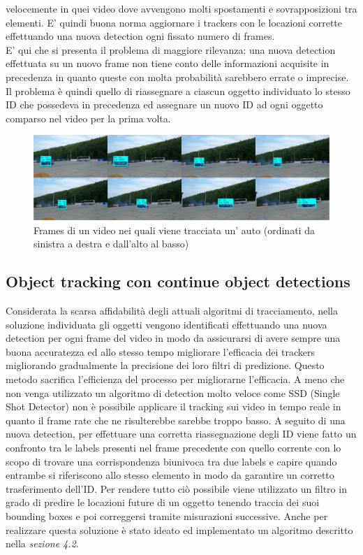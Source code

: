 velocemente in quei video dove avvengono molti spostamenti e sovrapposizioni tra elementi. E' quindi buona norma aggiornare i trackers con le locazioni corrette effettuando una nuova detection ogni fissato numero di frames.\\ E' qui che si presenta il problema di maggiore rilevanza: una nuova detection effettuata su un nuovo frame non tiene conto delle informazioni acquisite in precedenza in quanto queste con molta probabilità sarebbero errate o imprecise. Il problema è quindi quello di riassegnare a ciascun oggetto individuato lo stesso ID che possedeva in precedenza ed assegnare un nuovo ID ad ogni oggetto comparso nel video per la prima volta. 
\begin{figure}[H]
	\centering
	\includegraphics[width=1\linewidth]{images/esempio-tracking.jpg}
	\caption{Frames di un video nei quali viene tracciata un' auto (ordinati da sinistra a destra e dall'alto al basso)}
	\label{Esempio di un'immagine in alta risoluzione frammentata in regioni senza sovrapposizioni}
\end{figure}
\subsection{Object tracking con continue object detections}
Considerata la scarsa affidabilità degli attuali algoritmi di tracciamento, nella soluzione individuata gli oggetti vengono identificati effettuando una nuova detection per ogni frame del video in modo da assicurarsi di avere sempre una buona accuratezza ed allo stesso tempo migliorare l'efficacia dei trackers migliorando gradualmente la precisione dei loro filtri di predizione. Questo metodo sacrifica l'efficienza del processo per migliorarne l'efficacia. A meno che non venga utilizzato un algoritmo di detection molto veloce come SSD (Single Shot Detector) non è possibile applicare il tracking sui video in tempo reale in quanto il frame rate che ne risulterebbe sarebbe troppo basso. A seguito di una nuova detection, per effettuare una corretta riassegnazione degli ID viene fatto un confronto tra le labels presenti nel frame precedente con quello corrente con lo scopo di trovare una corrispondenza biunivoca tra due labels e capire quando entrambe si riferiscono allo stesso elemento in modo da garantire un corretto trasferimento dell'ID. Per rendere tutto ciò possibile viene utilizzato un filtro in grado di predire le locazioni future di un oggetto tenendo traccia dei suoi bounding boxes e poi correggersi tramite misurazioni successive. Anche per realizzare questa soluzione è stato ideato ed implementato un algoritmo descritto nella \textit{sezione 4.2}.
